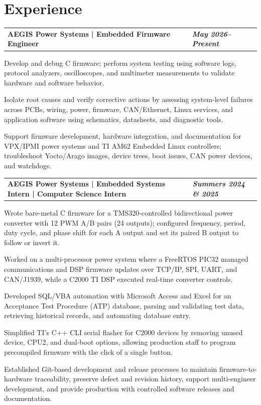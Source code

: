 \documentclass[10pt,letterpaper]{article}
\makeatletter
\newcommand{\resumeentry}[2]{%
  \begin{tabularx}{\textwidth}{@{}X>{\raggedleft\arraybackslash}p{2.40in}@{}}
    \textbf{#1} & \textbf{\textit{#2}}
  \end{tabularx}\vspace{-0.075cm}
}
\newcommand{\descriptorentry}[1]{%
  \begin{tabularx}{\textwidth}{@{}X>{\raggedleft\arraybackslash}p{2.40in}@{}}
    \textit{#1} &
  \end{tabularx}\vspace{-0.075cm}
}
\makeatother
\begin{document}
\section{Experience}
\resumeentry{AEGIS Power Systems | Embedded Firmware Engineer}{May 2026--Present}
\begin{resumebullets}
  \item Develop and debug C firmware; perform system testing using software logs, protocol analyzers, oscilloscopes, and multimeter measurements to validate hardware and software behavior.
  \item Isolate root causes and verify corrective actions by assessing system-level failures across PCBs, wiring, power, firmware, CAN/Ethernet, Linux services, and application software using schematics, datasheets, and diagnostic tools.
  \item Support firmware development, hardware integration, and documentation for VPX/IPMI power systems and TI AM62 Embedded Linux controllers; troubleshoot Yocto/Arago images, device trees, boot issues, CAN power devices, and watchdogs.
\end{resumebullets}

\resumeentry{AEGIS Power Systems | Embedded Systems Intern | Computer Science Intern}{Summers 2024 \& 2025}
\begin{resumebullets}
  \item Wrote bare-metal C firmware for a TMS320-controlled bidirectional power converter with 12 PWM A/B pairs (24 outputs); configured frequency, period, duty cycle, and phase shift for each A output and set its paired B output to follow or invert it.
  \item Worked on a multi-processor power system where a FreeRTOS PIC32 managed communications and DSP firmware updates over TCP/IP, SPI, UART, and CAN/J1939, while a C2000 TI DSP executed real-time converter controls.
\end{resumebullets}

\begin{resumebullets}
  \item Developed SQL/VBA automation with Microsoft Access and Excel for an Acceptance Test Procedure (ATP) database, parsing and validating test data, retrieving historical records, and automating database entry.
  \item Simplified TI's C++ CLI serial flasher for C2000 devices by removing unused device, CPU2, and dual-boot options, allowing production staff to program precompiled firmware with the click of a single button.
  \item Established Git-based development and release processes to maintain firmware-to-hardware traceability, preserve defect and revision history, support multi-engineer development, and provide production with controlled software releases and documentation.
\end{resumebullets}
\end{document}
